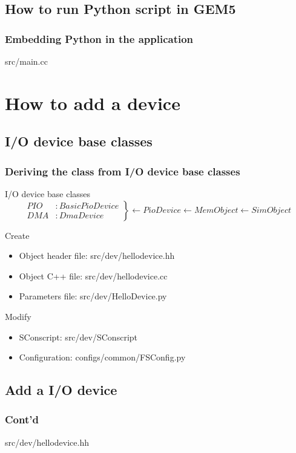 \documentclass{beamer}
\begin{document}
\subsection{How to run Python script in GEM5}
\begin{frame}
\frametitle{Embedding Python in the application}
\begin{block}{src/main.cc}
    
\end{block}
\end{frame}
\section{How to add a device}
\subsection{I/O device base classes}
\begin{frame}
\frametitle{Deriving the class from I/O device base classes}
\begin{block}{I/O device base classes}
    \begin{equation*}
	\left.
	\begin{aligned}
	    PIO &: BasicPioDevice\\ 
	    DMA &: DmaDevice 
	\end{aligned}
	\right\}
	\leftarrow PioDevice  \leftarrow MemObject  \leftarrow SimObject
    \end{equation*}
\end{block}
\begin{block}{Create\cite{asplos}}
    \begin{itemize} 
	\item Object header file: src/dev/hellodevice.hh
	\item Object C++ file: src/dev/hellodevice.cc
	\item Parameters file: src/dev/HelloDevice.py
    \end{itemize}
\end{block}
\begin{block}{Modify\cite{asplos}}
    \begin{itemize} 
	\item SConscript: src/dev/SConscript 
	\item Configuration: configs/common/FSConfig.py
    \end{itemize}
\end{block}
\end{frame}
\subsection{Add a I/O device}
\begin{frame}
    \frametitle{Cont'd}
    \begin{block}{src/dev/hellodevice.hh}
	
    \end{block}
\end{frame}
\end{document}

